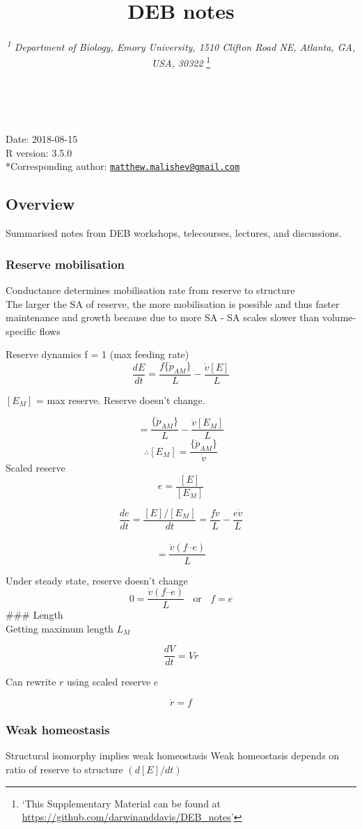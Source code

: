 \documentclass[10,portrait]{article}
\title{DEB notes}
\author{\emph{\textsuperscript{1} Department of Biology, Emory University, 1510
Clifton Road NE, Atlanta, GA, USA, 30322} \footnote{`This Supplementary
  Material can be found at
  \url{https://github.com/darwinanddavis/DEB_notes}'}}
\date{}
\begin{document}
\maketitle

{
\hypersetup{linkcolor=black}
\setcounter{tocdepth}{3}
\tableofcontents
}
~

Date: 2018-08-15\\
R version: 3.5.0\\
*Corresponding author:
\href{mailto:matthew.malishev@gmail.com}{\nolinkurl{matthew.malishev@gmail.com}}

\newpage   

\subsection{Overview}\label{overview}

Summarised notes from DEB workshops, telecourses, lectures, and
discussions.

\subsubsection{Reserve mobilisation}\label{reserve-mobilisation}

Conductance determines mobilisation rate from reserve to structure\\
The larger the SA of reserve, the more mobilisation is possible and thus
faster maintenance and growth because due to more SA - SA scales slower
than volume-specific flows

Reserve dynamics f = 1 (max feeding rate)\\
\[
\frac
  {d E}
  {d t}  
  = \frac
  {f\{\dot{p}_{AM}\}}
  {L}  
  - \frac  
  {\dot{v}[E]}  
  {L}   
\]

\([E_{M}]\) = max reserve. Reserve doesn't change.

\[
= \frac
  {\{\dot{p}_{AM}\}}
  {L} - 
  \frac
  {\dot{v}[E_{M}]}
  {L}    
\] \[
\therefore 
[E_{M}]
= \frac
  {\{\dot{p}_{AM}\}}
  {\dot{v}}
\] Scaled reserve \[
e =
\frac
{[E]}
{[E_{M}]}  
\]

\[
\frac
{de}
{dt}
= \frac
{[E] /[E_{M}]}
{dt} 
= \frac
{f\dot{v}}
{L}  - 
\frac
{e\dot{v}}
{L}     
\]\\
\[
= \frac
{\dot{v} (f – e)}
{L} 
\]

Under steady state, reserve doesn't change\\
\[
0 =
\frac
{\dot{v} (f – e)}
{L}
\ \ \ \
\text{or}
\ \ \ \ f = e
\] \#\#\# Length\\
Getting maximum length \(L_{M}\)

\[
\frac
{dV}
{dt}
= V\dot{r}  
\]

Can rewrite \(r\) using scaled reserve \(e\)

\[
\dot{r} = f
\]

\subsubsection{Weak homeostasis}\label{weak-homeostasis}

Structural isomorphy implies weak homeostasis Weak homeostasis depends
on ratio of reserve to structure \((d[E] / dt)\)

\printbibliography
\end{document}
